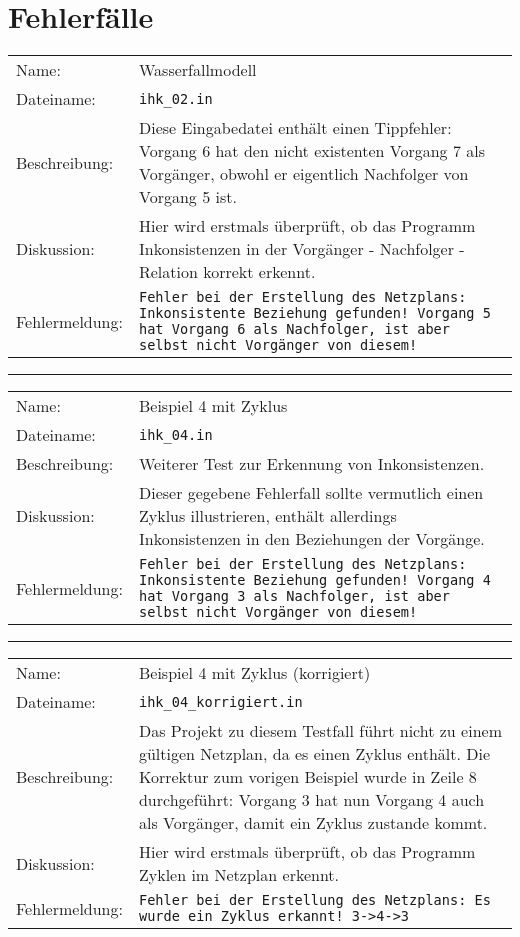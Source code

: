 \section{Fehlerf\"alle}
\begin{tabularx}{\textwidth}{l X}
  Name: & Wasserfallmodell \\
  Dateiname: & \texttt{ihk\_02.in} \\
  Beschreibung: & Diese Eingabedatei enth\"alt einen Tippfehler:
  Vorgang 6 hat den nicht existenten Vorgang 7 als Vorg\"anger, obwohl
  er eigentlich Nachfolger von Vorgang 5 ist.\\
  Diskussion: & Hier wird erstmals \"uberpr\"uft, ob das Programm
  Inkonsistenzen in der Vorg\"anger - Nachfolger - Relation korrekt
  erkennt.\\
  Fehlermeldung: & \texttt{Fehler bei der Erstellung des Netzplans:
    Inkonsistente Beziehung gefunden! Vorgang 5 hat Vorgang 6 als
    Nachfolger, ist aber selbst nicht Vorgänger von diesem!} \\
\end{tabularx}
\hrule
\begin{tabularx}{\textwidth}{l X}
  Name: & Beispiel 4 mit Zyklus \\
  Dateiname: & \texttt{ihk\_04.in} \\
  Beschreibung: &  Weiterer Test zur Erkennung von Inkonsistenzen.\\
  Diskussion: & Dieser gegebene Fehlerfall sollte vermutlich einen
  Zyklus illustrieren, enth\"alt allerdings Inkonsistenzen in den
  Beziehungen der Vorg\"ange. \\
  Fehlermeldung: & \texttt{Fehler bei der Erstellung des Netzplans:
    Inkonsistente Beziehung gefunden! Vorgang 4 hat Vorgang 3 als
    Nachfolger, ist aber selbst nicht Vorgänger von diesem!} \\
\end{tabularx}
\hrule
\begin{tabularx}{\textwidth}{l X}
  Name: & Beispiel 4 mit Zyklus (korrigiert) \\
  Dateiname: & \texttt{ihk\_04\_korrigiert.in} \\
  Beschreibung: & Das Projekt zu diesem Testfall f\"uhrt nicht zu
  einem g\"ultigen Netzplan, da es einen Zyklus enth\"alt. Die
  Korrektur zum vorigen Beispiel wurde in Zeile 8 durchgef\"uhrt:
  Vorgang 3 hat nun Vorgang 4 auch als Vorg\"anger, damit ein Zyklus
  zustande kommt. \\
  Diskussion: & Hier wird erstmals \"uberpr\"uft, ob das Programm
  Zyklen im Netzplan erkennt. \\
  Fehlermeldung: & \texttt{Fehler bei der Erstellung des Netzplans: Es
    wurde ein Zyklus erkannt! 3->4->3} \\
\end{tabularx}
